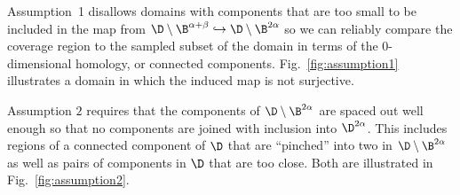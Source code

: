 
Assumption~1 disallows domains with components that are too small to be included in the map from $\D\setminus\B^{\alpha+\beta}\hookrightarrow\D\setminus\B^{2\alpha}$ so we can reliably compare the coverage region to the sampled subset of the domain in terms of the $0$-dimensional homology, or connected components.
Fig.~\ref{fig:assumption1} illustrates a domain in which the induced map is not surjective.

Assumption $2$ requires that the components of $\D\setminus\B^{2\alpha}$ are spaced out well enough so that no components are joined with inclusion into $\D^{2\alpha}$.
This includes regions of a connected component of $\D$ that are ``pinched'' into two in $\D\setminus\B^{2\alpha}$ as well as pairs of components in $\D$ that are too close.
Both are illustrated in Fig.~\ref{fig:assumption2}.

